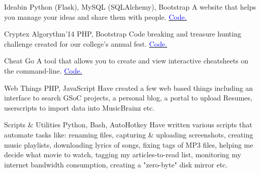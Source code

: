     {Ideabin}
    {}
    {\scriptsize Python (Flask), MySQL (SQLAlchemy), Bootstrap}
    {}
    {
        A website that helps you manage your ideas and share them with people.
        \hfill
        \href{http://github.com/ideabin/ideabin/}{\textcolor{blue}{\scriptsize Code.}}
    }
    \vspace*{0.2\baselineskip}

    {Cryptex}
    {Algorythm'14}
    {\scriptsize PHP, Bootstrap}
    {}
    {
        Code breaking and treasure hunting challenge created for our college's annual fest.
        \hfill
        \href{http://github.com/jdevlabs/cryptex/}{\textcolor{blue}{\scriptsize Code.}}
    }
    \vspace*{0.2\baselineskip}

\cventry{}
    {Cheat}
    {}
    {\scriptsize Go}
    {}
    {
        A tool that allows you to create and view interactive cheatsheets on the command-line.
        \hfill
        \href{http://github.com/dufferzafar/cheat/}{\textcolor{blue}{\scriptsize Code.}}
    }
    \vspace*{0.2\baselineskip}

 \cventry{}
     {Web Things}
     {}
     {\scriptsize PHP, JavaScript}
     {}
     {
        Have created a few web based things including
        an interface to search GSoC projects,
        a personal blog,
        a portal to upload Resumes,
        userscripts to import data into MusicBrainz etc.
     }
     \vspace*{0.2\baselineskip}

\cventry{}
    {Scripts \& Utilities}
    {}
    {\scriptsize Python, Bash, AutoHotkey}
    {}
    {
        Have written various scripts that automate tasks like:
        renaming files,
        capturing \& uploading screenshots,
        creating music playlists,
        downloading lyrics of songs,
        fixing tags of MP3 files,
        helping me decide what movie to watch,
        tagging my articles-to-read list,
        monitoring my internet bandwidth consumption,
        creating a "zero-byte" disk mirror etc.
    }
    \vspace*{0.2\baselineskip}
